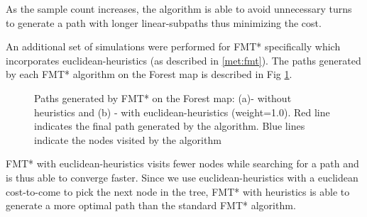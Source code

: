 \documentclass{article}
\begin{document}
As the sample count increases, the algorithm is able to avoid unnecessary turns to generate a path with longer linear-subpaths thus minimizing the cost.

An additional set of simulations were performed for FMT* specifically which incorporates euclidean-heuristics (as described in \ref{met:fmt}). The paths generated by each FMT* algorithm on the Forest map is described in Fig \ref{fmt:heur}.

\begin{figure}[H]
	\caption{Paths generated by FMT* on the Forest map: (a)- without heuristics and (b) - with euclidean-heuristics (weight=1.0). Red line indicates the final path generated by the algorithm. Blue lines indicate the nodes visited by the algorithm}
	\label{fmt:heur}
\end{figure}

FMT* with euclidean-heuristics visits fewer nodes while searching for a path and is thus able to converge faster. Since we use euclidean-heuristics with a euclidean cost-to-come to pick the next node in the tree, FMT* with heuristics is able to generate a more optimal path than the standard FMT* algorithm.
\end{document}
